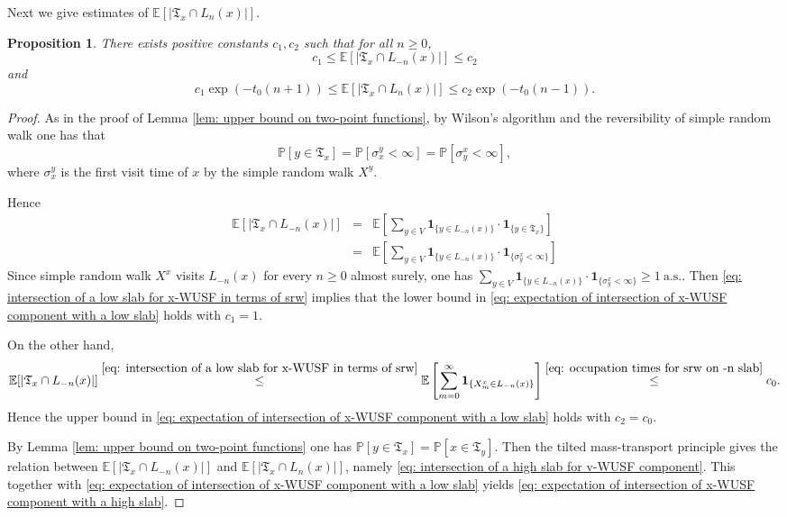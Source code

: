 \documentclass[12pt]{article}
\newtheorem{proposition}[theorem]{Proposition}
\numberwithin{equation}{section}
\newcommand{\be}{\begin{equation}}
\newcommand{\ee}{\end{equation}}
\def\as {\mathrm{a.s.}}
\newcommand{\1}{\mathbf{1}}
\begin{document}
 
 
 
 
 
 Next we give estimates of $\mathbb{E}[|\mathfrak{T}_x\cap L_{n}(x)|]$.
 
 \begin{proposition}\label{prop: slab intersection for the x-WUSF component}
 	There exists positive constants $c_{1},c_{2}$ such that for all $n\geq0$,
 	\be\label{eq: expectation of intersection of x-WUSF component with a low slab}
 	c_{1}\leq \mathbb{E}[|\mathfrak{T}_x\cap L_{-n}(x)|]\leq c_{2}
 	\ee
 	and 
 	\be\label{eq: expectation of intersection of x-WUSF component with a high slab}
 		c_{1}\exp(-t_0(n+1))\leq \mathbb{E}[|\mathfrak{T}_x\cap L_{n}(x)|]\leq c_{2}\exp(-t_0(n-1)).
 	\ee
 \end{proposition}
 \begin{proof}
 As in the proof of Lemma \ref{lem: upper bound on two-point functions},  by  Wilson's algorithm and the reversibility of simple random walk one has that
 \[
 \mathbb{P}[y\in\mathfrak{T}_x]=\mathbb{P}[\sigma_x^y<\infty]=\mathbb{P}[\sigma_y^x<\infty],
 \]
 where $\sigma_x^y$ is the first visit time of $x$ by the simple random walk $X^y$. 
 
 Hence 
 \begin{eqnarray}\label{eq: intersection of a low slab for x-WUSF in terms of srw}
 \mathbb{E}[|\mathfrak{T}_x\cap L_{-n}(x)|]
 &=&\mathbb{E}\left[\sum_{y\in V} \mathbf{1}_{ \{ y\in L_{-n}(x) \} }\cdot\mathbf{1}_{ \{ y\in\mathfrak{T}_x   \} }\right]\nonumber\\
 &=&\mathbb{E}\left[\sum_{y\in V} \mathbf{1}_{ \{ y\in L_{-n}(x) \} }\cdot\mathbf{1}_{ \{ \sigma_y^x<\infty   \} }\right]
 \end{eqnarray}
 Since simple random walk $X^x$ visits $L_{-n}(x)$ for every $n\geq0$ almost surely, 
one has  $\sum_{y\in V} \mathbf{1}_{ \{ y\in L_{-n}(x) \} }\cdot\mathbf{1}_{ \{ \sigma_y^x<\infty   \} }\geq 1\ \as$. Then 
 \eqref{eq: intersection of a low slab for x-WUSF in terms of srw} implies that the lower bound in \eqref{eq: expectation of intersection of x-WUSF component with a low slab} holds with $c_{1}=1$.
 
 On the other hand, 
 \[
 \mathbb{E}[|\mathfrak{T}_x\cap L_{-n}(x)|]\stackrel{\eqref{eq: intersection of a low slab for x-WUSF in terms of srw}}{\leq }\mathbb{E}\left[\sum_{m=0}^{\infty}\mathbf{1}_{ \{ X_m^x\in L_{-n}(x)  \}} \right]\stackrel{\eqref{eq: occupation times for srw on -n slab}}{\leq }c_0.
 \]
 Hence the upper bound in \eqref{eq: expectation of intersection of x-WUSF component with a low slab} holds with $c_{2}=c_0$. 
 
 By Lemma \ref{lem: upper bound on two-point functions} one has $\mathbb{P}[y\in\mathfrak{T}_x]=\mathbb{P}[x\in\mathfrak{T}_y]$. Then the tilted mass-transport principle gives the relation between $\mathbb{E}[|\mathfrak{T}_x\cap L_{-n}(x)|]$ and $\mathbb{E}[|\mathfrak{T}_x\cap L_{n}(x)|]$, namely \eqref{eq: intersection of a high slab for v-WUSF component}. This together with \eqref{eq: expectation of intersection of x-WUSF component with a low slab}   yields \eqref{eq: expectation of intersection of x-WUSF component with a high slab}.
 \end{proof}
 
\end{document}
